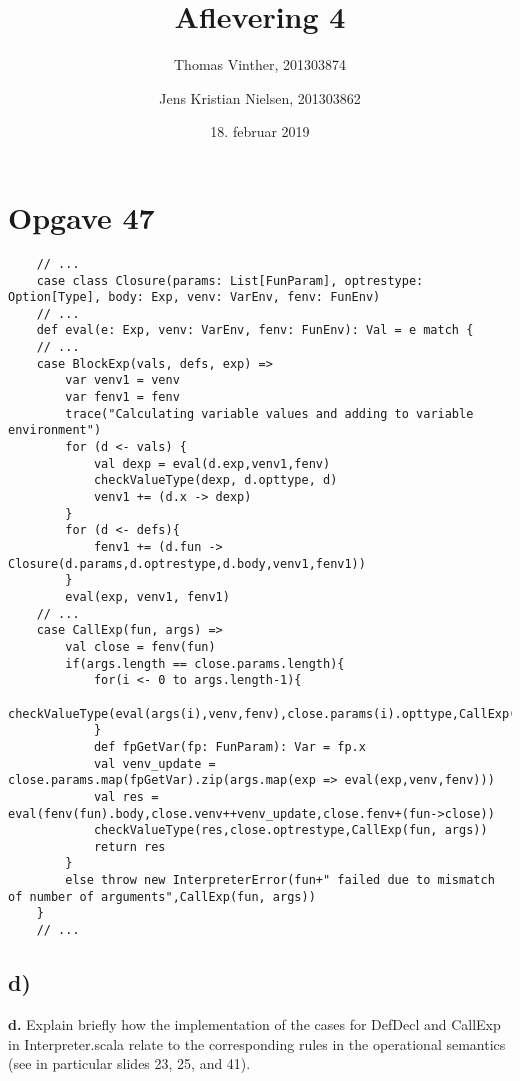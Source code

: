 \documentclass[a4paper, 10pt]{article}
\title{Aflevering 4}
\author{Thomas Vinther, 201303874 \and Jens Kristian Nielsen, 201303862}
\date{18. februar 2019}
\theoremstyle{remark}
\begin{document}
	\maketitle
	\section*{Opgave 47}
	\begin{lstlisting}
	// ...
	case class Closure(params: List[FunParam], optrestype: Option[Type], body: Exp, venv: VarEnv, fenv: FunEnv)
	// ...
	def eval(e: Exp, venv: VarEnv, fenv: FunEnv): Val = e match {
	// ...
	case BlockExp(vals, defs, exp) => 
		var venv1 = venv
		var fenv1 = fenv
		trace("Calculating variable values and adding to variable environment")
		for (d <- vals) {
			val dexp = eval(d.exp,venv1,fenv)
			checkValueType(dexp, d.opttype, d)
			venv1 += (d.x -> dexp)
		}
		for (d <- defs){
			fenv1 += (d.fun -> Closure(d.params,d.optrestype,d.body,venv1,fenv1))
		}
		eval(exp, venv1, fenv1)
	// ...
	case CallExp(fun, args) =>
		val close = fenv(fun)
		if(args.length == close.params.length){
			for(i <- 0 to args.length-1){
				checkValueType(eval(args(i),venv,fenv),close.params(i).opttype,CallExp(fun,args))
			}
			def fpGetVar(fp: FunParam): Var = fp.x
			val venv_update = close.params.map(fpGetVar).zip(args.map(exp => eval(exp,venv,fenv)))
			val res = eval(fenv(fun).body,close.venv++venv_update,close.fenv+(fun->close))
			checkValueType(res,close.optrestype,CallExp(fun, args))
			return res
		}
		else throw new InterpreterError(fun+" failed due to mismatch of number of arguments",CallExp(fun, args))
	}
	// ...
	\end{lstlisting}
	\subsection*{d)}
	\textbf{d.}
	Explain briefly how the implementation of the cases for DefDecl and CallExp in Interpreter.scala relate to the corresponding rules in the operational semantics (see in particular slides 23, 25, and 41).\\
	
\end{document}

